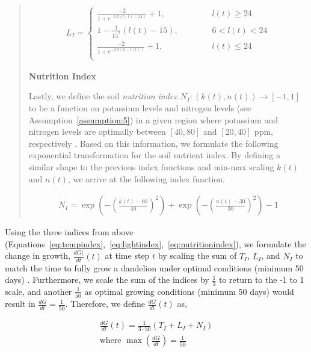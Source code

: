 \begin{quote}
\begin{align}
    L_I = 
    \begin{cases}
        \frac{-2}{1+e^{-0.5(l(t)-24)}} + 1, \hspace{2cm} & l(t) \geq 24 \\
        1 - \frac{1}{15^2} (l(t) - 15), & 6 < l(t) < 24 \\
        \frac{-2}{1+e^{-0.5(6-l(t))}} + 1, \hspace{2cm} & l(t) \leq 24 \\
    \end{cases}
    \label{eq:lightindex}
\end{align}

\textbf{Nutrition Index}

Lastly, we define the soil \textit{nutrition index} \(N_I: (k(t),n(t)) \longrightarrow [-1, 1]\) to be a function on potassium levels and nitrogen levels (see Assumption~\ref{assumption:5}) in a given region where potassium and nitrogen levels are optimally between \([40, 80]\) and \([20, 40]\) ppm, respectively \cite{arizona_guide_nodate}. Based on this information, we formulate the following exponential transformation for the soil nutrient index. By defining a similar shape to the previous index functions and min-max scaling \(k(t)\) and \(n(t)\), we arrive at the following index function.

\begin{align}
    N_I = \exp\left(-\left(\frac{k(t)-60}{40}\right)^2\right) + \exp\left(-\left(\frac{n(t)-30}{30}\right)^2\right) - 1
    \label{eq:nutritionindex}
\end{align}
\end{quote}


Using the three indices from above (Equations~\ref{eq:tempindex},~\ref{eq:lightindex},~\ref{eq:nutritionindex}), we formulate the change in growth, \(\frac{dG(}{dt}(t)\) at time step \(t\) by scaling the sum of \(T_I\), \(L_I\), and \(N_I\) to match the time to fully grow a dandelion under optimal conditions (minimum 50 days) \cite{gardeningknowhowDandelionHarvest}. Furthermore, we scale the sum of the indices by \(\frac{1}{3}\) to return to the -1 to 1 scale, and another \(\frac{1}{50}\) as optimal growing conditions (minimum 50 days) would result in \(\frac{dG}{dt} = \frac{1}{50}\). Therefore, we define \(\frac{dG}{dt}(t)\) as,

\begin{align}
    \frac{dG}{dt}(t) = \frac{1}{3 \cdot 50}\left(T_I+L_I+N_I\right) \\
    \text{where } \max\left(\frac{dG}{dt}\right) = \frac{1}{50} \nonumber
\end{align}

